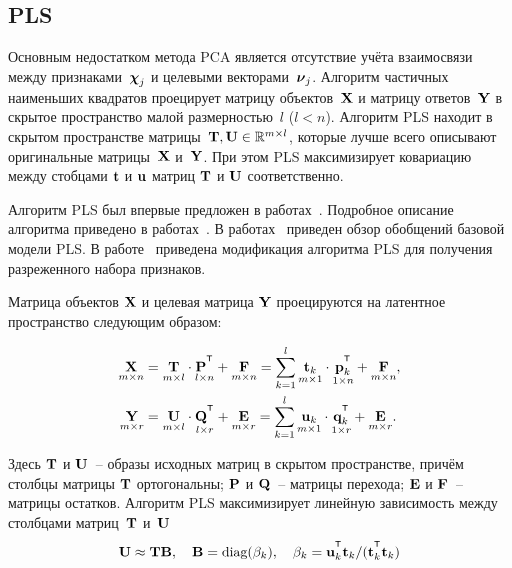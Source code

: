 \subsection{PLS}

Основным недостатком метода PCA является отсутствие учёта взаимосвязи между признаками~$\boldsymbol{\chi}_j$ и целевыми векторами~$\boldsymbol{\nu}_j$.
Алгоритм частичных наименьших квадратов проецирует матрицу объектов~$\mathbf{X}$ и матрицу ответов~$\mathbf{Y}$ в скрытое пространство малой размерностью~$l$ ($l < n$).
Алгоритм PLS находит в скрытом пространстве матрицы~$\mathbf{T}, \mathbf{U} \in \mathbb{R}^{m \times l}$, которые лучше всего описывают оригинальные матрицы~$\mathbf{X}$ и~$\mathbf{Y}$. 
При этом PLS максимизирует ковариацию между стобцами $\mathbf{t}$ и $\mathbf{u}$ матриц $\mathbf{T}$ и $\mathbf{U}$ соответственно.

Алгоритм PLS был впервые предложен в работах~\cite{wold1975path,wold1984collinearity,wold1982pls}. Подробное описание алгоритма приведено в работах~\cite{geladi1986partial,geladi1988notes,de1993simpls,vinzi2010handbook,brereton2014partial}.
В работах~\cite{rosipal2005overview,rosipal2011nonlinear} приведен обзор обобщений базовой модели PLS.
В работе~\cite{chun2010sparse} приведена модификация алгоритма PLS для получения разреженного набора признаков. 
 

Матрица объектов $\mathbf{X}$ и целевая матрица $\mathbf{Y}$ проецируются на латентное пространство следующим образом:

\begin{align}
	\label{ch1:eq:PLS_X}
	\underset{m \times n}{\bX} 
	&= \underset{m \times l}{\bT} \cdot \underset{l \times n}{\bP^{\T}} + \underset{m \times n}{\bF} 
	= \sum_{k=1}^l \underset{m \times 1}{\bt_k} \cdot \underset{1 \times n}{\bp_k^{\T}} + \underset{m \times n}{\bF},\\
	\label{ch1:eq:PLS_Y}
	\underset{m \times r}{\bY} 
	&= \underset{m \times l}{\bU} \cdot \underset{l \times r}{\bQ^{\T}} + \underset{m \times r}{\bE}
	=  \sum_{k=1}^l  \underset{m \times 1}{\bu_k} \cdot \underset{1 \times r}{\bq_k^{\T}} +  \underset{m \times r}{\bE}.
\end{align}

Здесь $\mathbf{T}$ и $\mathbf{U}$~-- образы исходных матриц в скрытом пространстве, причём столбцы матрицы $\mathbf{T}$ ортогональны; $\mathbf{P}$ и $\mathbf{Q}$~-- матрицы перехода; $\mathbf{E}$ и $\mathbf{F}$~-- матрицы остатков. 
Алгоритм PLS максимизирует линейную зависимость между столбцами матриц~$\mathbf{T}$ и~$\mathbf{U}$
\begin{equation*}
	\bU \approx \bT \bB, \quad \bB = \text{diag}(\beta_k), \quad \beta_k = \bu_k^{\T}\bt_k / (\bt_k^{\T}\bt_k)
\end{equation*}

